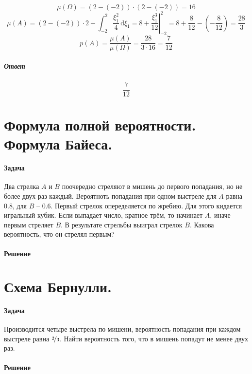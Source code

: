 \documentclass[fleqn, 10pt]{article}
\begin{document}
\[\mu(\Omega) = (2 - (-2))\cdot(2 - (-2)) = 16\]
\[\mu(A) = (2 - (-2))\cdot 2 + \int_{-2}^{2}\frac{\xi_1^2}{4}\,\mathrm{d}\xi_1 = 8 + \left.\frac{\xi_1^3}{12}\right|_{-2}^2 = 8 + \frac{8}{12} - (-\frac{8}{12}) = \frac{28}{3}\]
\[p(A) = \frac{\mu(A)}{\mu(\Omega)} = \frac{28}{3\cdot16} = \frac{7}{12}\]
\subparagraph{Ответ}
\[\frac{7}{12}\]
\section{Формула полной вероятности. Формула Байеса.}
\paragraph{Задача}
Два стрелка \(A\) и \(B\) поочередно стреляют в мишень до первого попадания, но не более двух раз каждый. Вероятноть попадания при одном выстреле для \(A\) равна \(0.8\), для \(B\) -- \(0.6\). Первый стрелок опеределяется по жребию. Для этого кидается игральный кубик. Если выпадает число, кратное трём, то начинает \(A\), иначе первым стреляет \(B\). В результате стрельбы выиграл стрелок \(B\). Какова вероятность, что он стрелял первым?
\paragraph{Решение}
  
\section{Схема Бернулли.}
\paragraph{Задача}
Производится четыре выстрела по мишени, вероятность попадания при каждом выстреле равна \(\nicefrac{2}{3}\). Найти вероятность того, что в мишень попадут не менее двух раз.
\paragraph{Решение}
\end{document}
